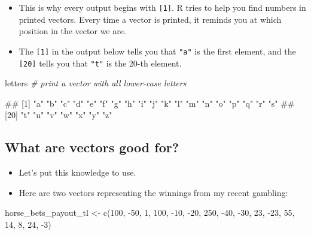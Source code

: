 \documentclass[
]{book}
\newenvironment{Shaded}{\begin{snugshade}}{\end{snugshade}}
\newcommand{\CommentTok}[1]{\textcolor[rgb]{0.56,0.35,0.01}{\textit{#1}}}
\newcommand{\DecValTok}[1]{\textcolor[rgb]{0.00,0.00,0.81}{#1}}
\newcommand{\FunctionTok}[1]{\textcolor[rgb]{0.00,0.00,0.00}{#1}}
\newcommand{\NormalTok}[1]{#1}
\newcommand{\OtherTok}[1]{\textcolor[rgb]{0.56,0.35,0.01}{#1}}
\newcommand{\SpecialCharTok}[1]{\textcolor[rgb]{0.00,0.00,0.00}{#1}}
\providecommand{\tightlist}{%
  \setlength{\itemsep}{0pt}\setlength{\parskip}{0pt}}
\begin{document}
\begin{itemize}
\tightlist
\item
  This is why every output begins with \texttt{{[}1{]}}. R tries to help you find numbers in printed vectors. Every time a vector is printed, it reminds you at which position in the vector we are.
\item
  The \texttt{{[}1{]}} in the output below tells you that \texttt{"a"} is the first element, and the \texttt{{[}20{]}} tells you that \texttt{"t"} is the 20-th element.
\end{itemize}

\begin{Shaded}
\begin{Highlighting}[]
\NormalTok{letters }\CommentTok{\# print a vector with all lower{-}case letters}
\end{Highlighting}
\end{Shaded}

\begin{Shaded}
\begin{Highlighting}[]
\NormalTok{\#\#  [1] "a" "b" "c" "d" "e" "f" "g" "h" "i" "j" "k" "l" "m" "n" "o" "p" "q" "r" "s"}
\NormalTok{\#\# [20] "t" "u" "v" "w" "x" "y" "z"}
\end{Highlighting}
\end{Shaded}

\hypertarget{what-are-vectors-good-for}{%
\subsection{What are vectors good for?}\label{what-are-vectors-good-for}}

\begin{itemize}
\tightlist
\item
  Let's put this knowledge to use.
\item
  Here are two vectors representing the winnings from my recent gambling:
\end{itemize}

\begin{Shaded}
\begin{Highlighting}[]
\NormalTok{horse\_bets\_payout\_tl }\OtherTok{\textless{}{-}} \FunctionTok{c}\NormalTok{(}\DecValTok{100}\NormalTok{, }\SpecialCharTok{{-}}\DecValTok{50}\NormalTok{, }\DecValTok{1}\NormalTok{, }\DecValTok{100}\NormalTok{, }\SpecialCharTok{{-}}\DecValTok{10}\NormalTok{, }\SpecialCharTok{{-}}\DecValTok{20}\NormalTok{, }\DecValTok{250}\NormalTok{, }\SpecialCharTok{{-}}\DecValTok{40}\NormalTok{, }\SpecialCharTok{{-}}\DecValTok{30}\NormalTok{, }\DecValTok{23}\NormalTok{, }\SpecialCharTok{{-}}\DecValTok{23}\NormalTok{, }\DecValTok{55}\NormalTok{, }\DecValTok{14}\NormalTok{, }\DecValTok{8}\NormalTok{, }\DecValTok{24}\NormalTok{, }\SpecialCharTok{{-}}\DecValTok{3}\NormalTok{)}
\end{Highlighting}
\end{Shaded}
\end{document}

